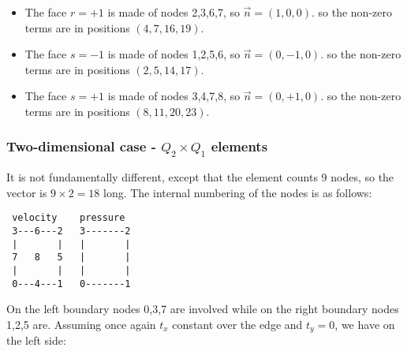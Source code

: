 \begin{itemize}
\item
The face $r=+1$ is made of nodes 2,3,6,7, so $\vec{n}=(1,0,0)$.
so the non-zero terms are in positions $(4,7,16,19)$.

\item
The face $s=-1$ is made of nodes 1,2,5,6, so $\vec{n}=(0,-1,0)$.
so the non-zero terms are in positions $(2,5,14,17)$.

\item
The face $s=+1$ is made of nodes 3,4,7,8, so $\vec{n}=(0,+1,0)$.
so the non-zero terms are in positions $(8,11,20,23)$.

\end{itemize}


\subsubsection{Two-dimensional case - $Q_2 \times Q_1$ elements}

It is not fundamentally different, except that the element counts 9 nodes, 
so the vector is $9\times 2=18$ long. 
The internal numbering of the nodes is as follows:
\begin{verbatim}
 velocity    pressure
 3---6---2   3-------2
 |       |   |       |
 7   8   5   |       |
 |       |   |       |
 0---4---1   0-------1
\end{verbatim}

On the left boundary nodes 0,3,7 are involved while on the right 
boundary nodes 1,2,5 are.
Assuming once again $t_x$ constant over the edge and $t_y=0$, we
have on the left side:

